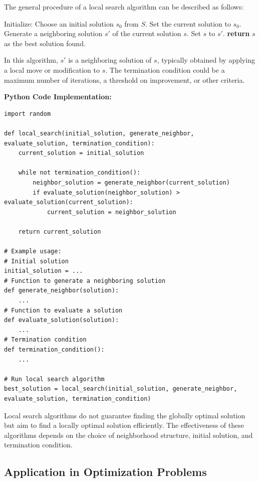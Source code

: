 \documentclass[12pt]{book} %
\begin{document}
The general procedure of a local search algorithm can be described as follows:
\FloatBarrier
\begin{algorithm}[H]
\caption{Local Search Algorithm}
\begin{algorithmic}[1]
\State Initialize: Choose an initial solution \(s_0\) from \(S\).
\State Set the current solution to \(s_0\).
    \State Generate a neighboring solution \(s'\) of the current solution \(s\).
        \State Set \(s\) to \(s'\).
    \EndIf
\EndWhile
\State \textbf{return} \(s\) as the best solution found.
\end{algorithmic}
\end{algorithm}
\FloatBarrier
In this algorithm, \(s'\) is a neighboring solution of \(s\), typically obtained by applying a local move or modification to \(s\). The termination condition could be a maximum number of iterations, a threshold on improvement, or other criteria.

\textbf{Python Code Implementation:}
\FloatBarrier
\begin{lstlisting}
import random

def local_search(initial_solution, generate_neighbor, evaluate_solution, termination_condition):
    current_solution = initial_solution
    
    while not termination_condition():
        neighbor_solution = generate_neighbor(current_solution)
        if evaluate_solution(neighbor_solution) > evaluate_solution(current_solution):
            current_solution = neighbor_solution
            
    return current_solution

# Example usage:
# Initial solution
initial_solution = ...
# Function to generate a neighboring solution
def generate_neighbor(solution):
    ...
# Function to evaluate a solution
def evaluate_solution(solution):
    ...
# Termination condition
def termination_condition():
    ...

# Run local search algorithm
best_solution = local_search(initial_solution, generate_neighbor, evaluate_solution, termination_condition)
\end{lstlisting}
\FloatBarrier
Local search algorithms do not guarantee finding the globally optimal solution but aim to find a locally optimal solution efficiently. The effectiveness of these algorithms depends on the choice of neighborhood structure, initial solution, and termination condition.

\subsection{Application in Optimization Problems}
\end{document}
